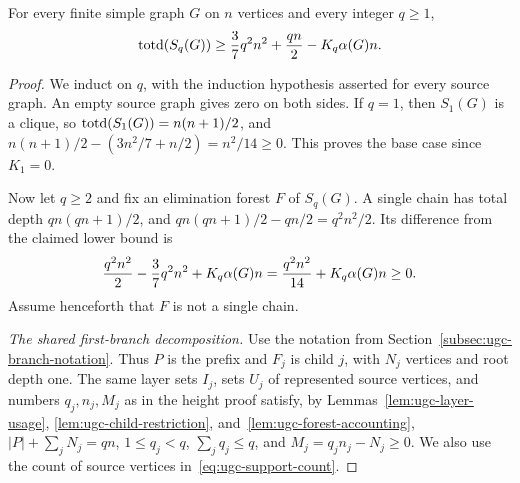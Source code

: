 \begin{theorem}
\label{thm:total-depth-structural}
For every finite simple graph $G$ on $n$ vertices and every integer
$q\geq1$,
\begin{equation}\label{eq:total-depth-structural}
 \operatorname{totd}(S_q(G))\geq
 \frac37q^2n^2+\frac{qn}{2}-K_q\alpha(G)n.
\end{equation}
\end{theorem}

\begin{proof}
We induct on $q$, with the induction hypothesis asserted for every
source graph. An empty source graph
gives zero on both sides. If $q=1$, then $S_1(G)$ is a clique, so
$\operatorname{totd}(S_1(G))=n(n+1)/2$, and
$n(n+1)/2-(3n^2/7+n/2)=n^2/14\geq0$.
This proves the base case since $K_1=0$.

Now let $q\geq2$ and fix an elimination forest $F$ of $S_q(G)$.
A single chain has total depth $qn(qn+1)/2$, and
$qn(qn+1)/2-qn/2=q^2n^2/2$. Its difference from the claimed
lower bound is
\[
 \frac{q^2n^2}{2}-\frac37q^2n^2+K_q\alpha(G)n
 =\frac{q^2n^2}{14}+K_q\alpha(G)n\geq0.
\]
Assume henceforth that $F$ is not a single chain.

\emph{The shared first-branch decomposition.}
Use the notation from Section~\ref{subsec:ugc-branch-notation}.
Thus $P$ is the prefix and $F_j$ is child $j$, with
$N_j$ vertices and root depth one. The same layer sets $I_j$,
sets $U_j$ of represented source vertices, and numbers $q_j,n_j,M_j$ as in the
height proof satisfy, by Lemmas~\ref{lem:ugc-layer-usage},
\ref{lem:ugc-child-restriction}, and~\ref{lem:ugc-forest-accounting},
$|P|+\sum_jN_j=qn$, $1\leq q_j<q$, $\sum_jq_j\leq q$, and
$M_j=q_jn_j-N_j\geq0$.
We also use the count of source vertices in~\eqref{eq:ugc-support-count}.


\end{proof}
